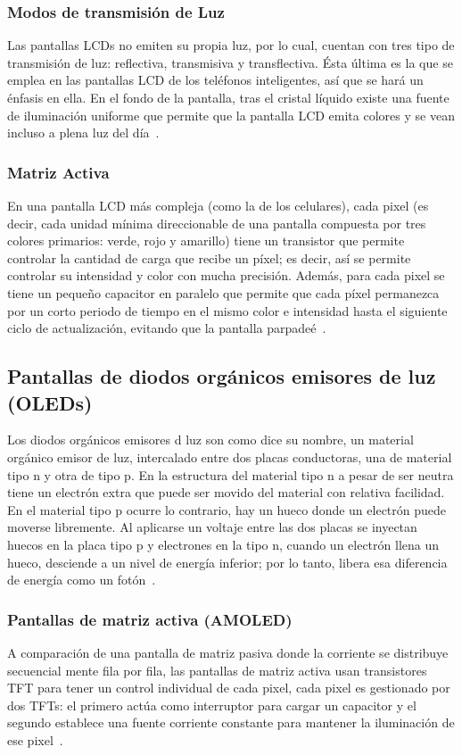 \documentclass[twocolumn]{article}
\begin{document}
\subsubsection{Modos de transmisión de Luz}
Las pantallas LCDs no emiten su propia luz, por lo cual, cuentan con tres tipo de transmisión de luz: reflectiva, transmisiva y transflectiva. Ésta última es la que se emplea en las pantallas LCD de los teléfonos inteligentes, así que se hará un énfasis en ella. En el fondo de la pantalla, tras el cristal líquido existe una fuente de iluminación uniforme que permite que la pantalla LCD emita colores y se vean incluso a plena luz del día~\cite{gurski2005display}.

\subsubsection{Matriz Activa}
En una pantalla LCD más compleja (como la de los celulares), cada pixel (es decir, cada unidad mínima direccionable de una pantalla compuesta por tres colores primarios: verde, rojo y amarillo) tiene un transistor que permite controlar la cantidad de carga que recibe un píxel; es decir, así se permite controlar su intensidad y color con mucha precisión. Además, para cada pixel se tiene un pequeño capacitor en paralelo que permite que cada píxel permanezca por un corto periodo de tiempo en el mismo color e intensidad hasta el siguiente ciclo de actualización, evitando que la pantalla parpadeé~\cite{gurski2005display}.
\subsection{Pantallas de diodos orgánicos emisores de luz (OLEDs)}
Los diodos orgánicos emisores d luz son como dice su nombre, un material orgánico emisor de luz, intercalado entre dos placas conductoras, una de material tipo n y otra de tipo p. En la estructura del material tipo n a pesar de ser neutra tiene un electrón extra que puede ser movido del material con relativa facilidad. En el material tipo p ocurre lo contrario, hay un hueco donde un electrón puede moverse libremente. Al aplicarse un voltaje entre las dos placas se inyectan huecos en la placa tipo p y electrones en la tipo n, cuando un electrón llena un hueco, desciende a un nivel de energía inferior; por lo tanto, libera esa diferencia de energía como un fotón~\cite{gurski2005display}.

\subsubsection{Pantallas de matriz activa (AMOLED)}
A comparación de una pantalla de matriz pasiva donde la corriente se distribuye secuencial mente fila por fila, las pantallas de matriz activa usan transistores TFT para tener un control individual de cada pixel, cada pixel es gestionado por dos TFTs: el primero actúa como interruptor para cargar un capacitor y el segundo establece una fuente corriente constante para mantener la iluminación de ese pixel~\cite{gurski2005display}.
\end{document}
